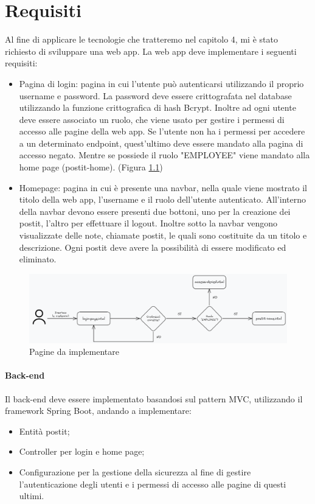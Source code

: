 \chapter{Requisiti}
Al fine di applicare le tecnologie che tratteremo nel capitolo 4, mi è stato richiesto di sviluppare una web app.
La web app deve implementare i seguenti requisiti:
\begin{itemize} 
    \item Pagina di login: pagina in cui l'utente può autenticarsi utilizzando il proprio username e password. La password deve essere crittografata nel database utilizzando la funzione crittografica di hash Bcrypt. Inoltre ad ogni utente deve essere associato un ruolo, che viene usato per gestire i permessi di accesso alle pagine della web app. Se l'utente non ha i permessi per accedere a un determinato endpoint, quest'ultimo deve essere mandato alla pagina di accesso negato. Mentre se possiede il ruolo "EMPLOYEE" viene mandato alla home page (postit-home). (Figura \ref{fig:pagine})
    \item Homepage: pagina in cui è presente una navbar, nella quale viene mostrato il titolo della web app, l'username e il ruolo dell'utente autenticato. All'interno della navbar devono essere presenti due bottoni, uno per la creazione dei postit, l'altro per effettuare il logout.
    Inoltre sotto la navbar vengono visualizzate delle note, chiamate postit, le quali sono costituite da un titolo e descrizione. Ogni postit deve avere la possibilità di essere modificato ed eliminato.
\end{itemize}
\begin{figure}[h]
    \centering
    \includegraphics[width=1.0\textwidth]{images/funzionamento pagine.png}
    \caption{Pagine da implementare}
    \label{fig:pagine}
\end{figure}
\newpage
\subsubsection{Back-end}
Il back-end deve essere implementato basandosi sul pattern MVC, utilizzando il framework Spring Boot, andando a implementare:
\begin{itemize}
    \item Entità postit;
    \item Controller per login e home page;
    \item Configurazione per la gestione della sicurezza al fine di gestire l'autenticazione degli utenti e i permessi di accesso alle pagine di questi ultimi.
\end{itemize}
